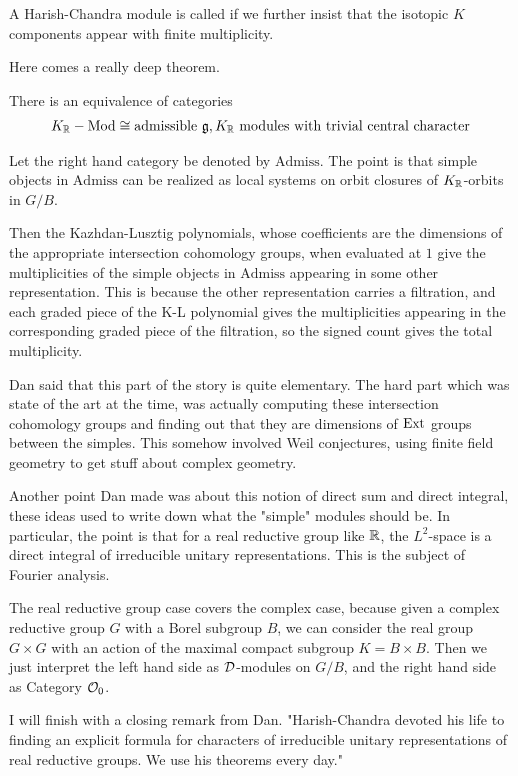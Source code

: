 \documentclass[12pt]{article}
\begin{document}
\begin{definition}
    A Harish-Chandra module is called  if we further insist
    that the isotopic $K$ components appear with finite multiplicity.
\end{definition}

Here comes a really deep theorem.

\begin{theorem}
    There is an equivalence of categories \begin{align*}
        K_{\mathbb{R}}-\operatorname{Mod} \cong \text{admissible $\mathfrak{g},K_{\mathbb{R}}$ modules with trivial central character}
    \end{align*}
\end{theorem} Let the right hand category be denoted by $\text{Admiss}$.
The point is that simple objects 
in $\text{Admiss}$
can be realized as local systems on orbit 
closures of $K_{\mathbb{R}}$-orbits in $G/B$. 

\hfill

Then the Kazhdan-Lusztig polynomials, whose coefficients
are the dimensions of the appropriate intersection 
cohomology groups, when evaluated at $1$ give the
multiplicities of the simple objects in $\text{Admiss}$ appearing
in some other representation. This is because the other representation carries a filtration, 
and each graded piece of the K-L polynomial gives the multiplicities
appearing in the corresponding graded piece of the filtration, so 
the signed count gives the total multiplicity.

\begin{remark}
    Dan said that this part of the story is quite elementary. The hard 
    part which was state of the art at the time, was actually computing
    these intersection cohomology groups and finding out that they 
    are dimensions of $\operatorname{Ext}$ groups between the simples. This 
    somehow involved Weil conjectures, using finite field geometry 
    to get stuff about complex geometry.
\end{remark}

\begin{remark}
    Another point Dan made was about this notion of direct sum and direct
    integral, these ideas used to write down what the 
    "simple" modules should be. In particular, the point is that for 
    a real reductive group like $\mathbb{R}$, the $L^2$-space is a direct integral
    of irreducible unitary representations. This 
    is the subject of Fourier analysis.
\end{remark}

The real reductive group case covers the complex case, because
given a complex reductive group $G$ with a Borel subgroup $B$,
we can consider the real group $G\times G$ with an action of the 
maximal compact subgroup $K = B \times B$. Then 
we just interpret the left hand side as ${\mathcal{D}}$-modules on $G/B$, and 
the right hand side as Category ${\mathcal{O}}_0$.

\hfill

I will finish with a closing remark from Dan. 
"Harish-Chandra devoted his life to finding an explicit 
formula for characters of irreducible unitary representations
of real reductive groups. We use his theorems every day."
\end{document}
